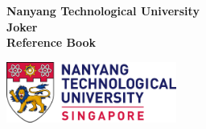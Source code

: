 \documentclass[9pt,landscape]{article}
\begin{document}
\thispagestyle{empty}
\null\vfill
\begin{center}
  \Huge \textbf{Nanyang Technological University \\Joker \\Reference Book}

\vspace{1.5cm}

\includegraphics[height=2cm]{NTU_Logo.pdf}
\end{center}
\vfill
\clearpage

\begin{multicols}{2}
\tableofcontents
\end{multicols}

\newpage
\end{document}
